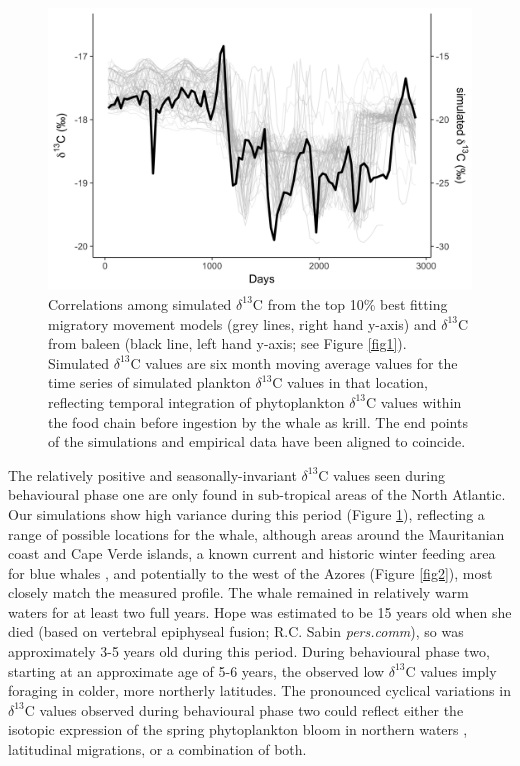\documentclass[a4paper,12pt]{article}
\begin{document}
\begin{figure}
 \centering
  \includegraphics[width = \linewidth]{figures/Figure-3-blue-sims.png}
  \caption{Correlations among simulated $\delta^{13}$C from the top 10\% best fitting migratory movement models (grey lines, right hand y-axis) and $\delta^{13}$C from baleen (black line, left hand y-axis; see Figure \ref{fig1}). 
  Simulated $\delta^{13}$C values are six month moving average values for the time series of simulated plankton $\delta^{13}$C values in that location, reflecting temporal integration of phytoplankton $\delta^{13}$C values within the food chain before ingestion by the whale as krill. 
  The end points of the simulations and empirical data have been aligned to coincide.
}
  \label{fig3}
\end{figure}
 
The relatively positive and seasonally-invariant $\delta^{13}$C values seen during behavioural phase one are only found in sub-tropical areas of the North Atlantic.  
Our simulations show high variance during this period (Figure \ref{fig3}), reflecting a range of possible locations for the whale, although areas around the Mauritanian coast and Cape Verde islands, a known current and historic winter feeding area for blue whales  \cite{baines2014upwellings,reeves2004historical}, and potentially to the west of the Azores (Figure \ref{fig2}), most closely match the measured profile. 
The whale remained in relatively warm waters for at least two full years. 
Hope was estimated to be 15 years old when she died (based on vertebral epiphyseal fusion; R.C. Sabin \textit{pers.comm}), so was approximately 3-5 years old during this period.
During behavioural phase two, starting at an approximate age of 5-6 years, the observed low $\delta^{13}$C values imply foraging in colder, more northerly latitudes. 
The pronounced cyclical variations in $\delta^{13}$C values observed during behavioural phase two could reflect either the isotopic expression of the spring phytoplankton bloom in northern waters \cite{magozzi2017using}, latitudinal migrations, or a combination of both.  
\end{document}

